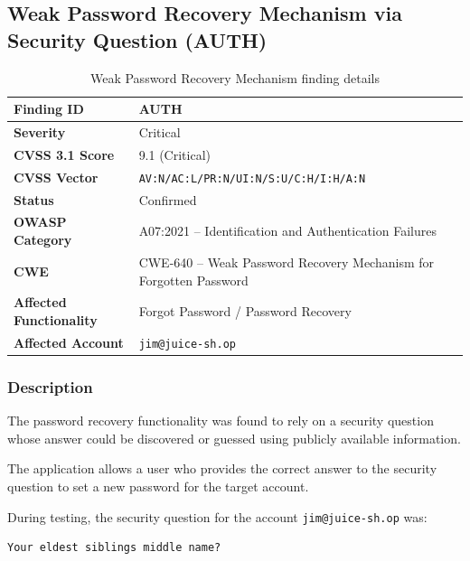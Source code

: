 
\subsection*{Weak Password Recovery Mechanism via Security Question (AUTH)}

\begin{table}[H]
\centering
\begin{tabular}{|l|p{10cm}|}
\hline
\textbf{Finding ID} & AUTH \\
\hline
\textbf{Severity} & Critical \\
\hline
\textbf{CVSS 3.1 Score} & 9.1 (Critical) \\
\hline
\textbf{CVSS Vector} & \texttt{AV:N/AC:L/PR:N/UI:N/S:U/C:H/I:H/A:N} \\
\hline
\textbf{Status} & Confirmed \\
\hline
\textbf{OWASP Category} & A07:2021 -- Identification and Authentication Failures \\
\hline
\textbf{CWE} & CWE-640 -- Weak Password Recovery Mechanism for Forgotten Password \\
\hline
\textbf{Affected Functionality} & Forgot Password / Password Recovery \\
\hline
\textbf{Affected Account} & \texttt{jim@juice-sh.op} \\
\hline
\end{tabular}
\caption{Weak Password Recovery Mechanism finding details}
\end{table}

\subsubsection*{Description}

The password recovery functionality was found to rely on a security
question whose answer could be discovered or guessed using publicly
available information.

The application allows a user who provides the correct answer to the
security question to set a new password for the target account.

During testing, the security question for the account
\texttt{jim@juice-sh.op} was:

\begin{lstlisting}
Your eldest siblings middle name?
\end{lstlisting}

